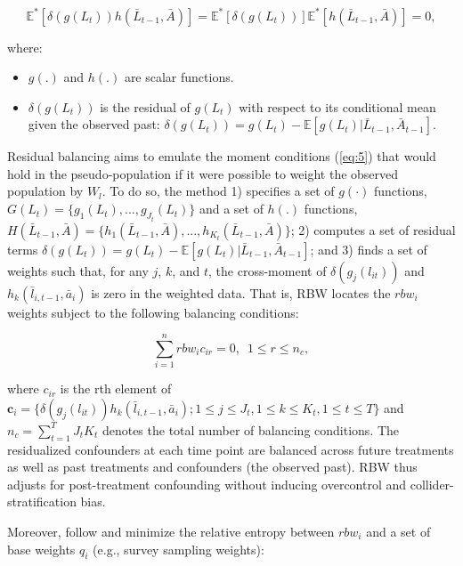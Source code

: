 \begin{equation}
\label{eq:5}
\mathbb{E}^{*}[\delta(g(L_{t}))h(\bar{L}_{t-1},\bar{A})]=\mathbb{E}^{*}[\delta(g(L_{t}))]\mathbb{E}^{*}[h(\bar{L}_{t-1},\bar{A})]=0,
\end{equation}

where:

\begin{itemize}
\tightlist
\item
  \(g(.)\) and \(h(.)\) are scalar functions.
\item
  \(\delta(g(L_{t}))\) is the residual of \(g(L_{t})\) with respect to
  its conditional mean given the observed past:
  \(\delta(g(L_{t}))=g(L_{t})-\mathbb{E}[g(L_{t})|\bar{L}_{t-1},\bar{A}_{t-1}]\).
\end{itemize}

Residual balancing aims to emulate the moment conditions (\ref{eq:5})
that would hold in the pseudo-population if it were possible to weight
the observed population by \(W_{l}\). To do so, the method 1) specifies
a set of \(g(\cdot)\) functions,
\(G(L_{t})=\{g_{1}(L_{t}),...,g_{J_{t}}(L_{t})\}\) and a set of \(h(.)\)
functions,
\(H(\bar{L}_{t-1},\bar{A})=\{h_{1}(\bar{L}_{t-1},\bar{A}),...,h_{K_{t}}(\bar{L}_{t-1},\bar{A})\}\);
2) computes a set of residual terms
\(\delta(g(L_{t}))=g(L_{t})-\mathbb{E}[g(L_{t})|\bar{L}_{t-1},\bar{A}_{t-1}]\);
and 3) finds a set of weights such that, for any \(j\), \(k\), and
\(t\), the cross-moment of \(\delta(g_{j}(l_{it}))\) and
\(h_{k}(\bar{l}_{i,t-1},\bar{a}_{i})\) is zero in the weighted data.
That is, RBW locates the \(rbw_{i}\) weights subject to the following
balancing conditions:

\begin{equation}
\label{eq:6}
\sum^{n}_{i=1}rbw_{i}c_{ir}=0, \,\,\, 1 \le r \le n_{c},
\end{equation}

where \(c_{ir}\) is the rth element of
\(\boldsymbol{c}_{i}=\{\delta(g_{j}(l_{it}))h_{k}(\bar{l}_{i,t-1},\bar{a}_{i}); 1 \le j \le J_{t}, 1 \le k \le K_{t}, 1 \le t \le T\}\)
and \(n_{c}=\sum^{T}_{t=1}J_{t}K_{t}\) denotes the total number of
balancing conditions. The residualized confounders at each time point
are balanced across future treatments as well as past treatments and
confounders (the observed past). RBW thus adjusts for post-treatment
confounding without inducing overcontrol and collider-stratification
bias.

Moreover, \citet{zhouResidualBalancingMethod2020a} follow
\citet{hainmuellerEntropyBalancingCausal2012} and minimize the relative
entropy between \(rbw_{i}\) and a set of base weights \(q_{i}\) (e.g.,
survey sampling weights):

